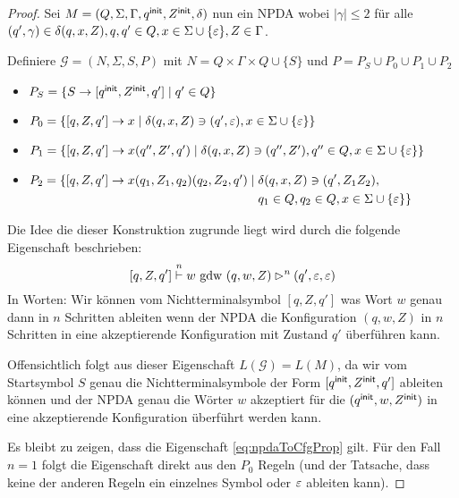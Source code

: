 \begin{proof}
 Sei $M = (Q, \Sigma, \Gamma, q^\mathsf{init}, Z^\mathsf{init}, \delta)$ nun ein NPDA wobei $|\gamma| \le 2$ für alle $(q', \gamma) \in \delta(q, x, Z), q, q' \in Q, x \in \Sigma \cup \{\varepsilon\}, Z \in \Gamma$.

    Definiere $\mathcal{G} = (N, \Sigma, S, P)$ mit $N = Q \times \Gamma \times Q \cup \{S\}$  und $P=P_S\cup P_0\cup P_1\cup P_2$
    \begin{itemize}
    \item $P_S = \{S \to [q^\mathsf{init}, Z^\mathsf{init}, q']\mid q'\in Q\}$
    \item $P_0 = \{ [q, Z, q'] \to x \mid \delta(q, x, Z) \ni (q', \varepsilon), x \in \Sigma \cup \{\varepsilon\} \}$
    \item $P_1 = \{[q, Z, q'] \to x(q'', Z', q') \mid \delta(q, x, Z) \ni (q'', Z'), q'' \in Q, x \in \Sigma \cup \{\varepsilon\}\}$
    \item $P_2 = \{[q, Z, q'] \to x(q_1,Z_1,q_2)(q_2, Z_2, q') \mid 
        \begin{aligned}[t]
          & \delta(q, x, Z) \ni (q', Z_1Z_2), \\
          & q_1 \in Q, q_2 \in Q, x \in \Sigma \cup \{\varepsilon\} \}
        \end{aligned}$
    \end{itemize}
    
    Die Idee die dieser Konstruktion zugrunde liegt wird durch die folgende Eigenschaft beschrieben:
      \begin{displaymath}\label{eq:npdaToCfgProp}
        [q,Z,q']\stackrel{n}{\vdash} w \text{ gdw } (q,w,Z) \rhd^n (q',\varepsilon,\varepsilon)
      \end{displaymath}
    In Worten: Wir können vom Nichtterminalsymbol $[q,Z,q']$ was Wort $w$ genau dann in $n$ Schritten ableiten
    wenn der \ac{NPDA} die Konfiguration $(q,w,Z)$ in $n$ Schritten in eine akzeptierende Konfiguration mit Zustand $q'$ überführen kann.
    
    Offensichtlich folgt aus dieser Eigenschaft $L(\mathcal{G}) = L(M)$, da wir vom Startsymbol $S$ genau die Nichtterminalsymbole der Form
    $[q^\mathsf{init}, Z^\mathsf{init}, q']$ ableiten können und der \ac{NPDA} genau die Wörter $w$ akzeptiert für die  $(q^\mathsf{init}, w, Z^\mathsf{init})$ in eine akzeptierende Konfiguration überführt werden kann.
    
    Es bleibt zu zeigen, dass die Eigenschaft \eqref{eq:npdaToCfgProp} gilt.
    Für den Fall $n=1$ folgt die Eigenschaft direkt aus den $P_0$ Regeln (und der Tatsache, dass keine der anderen Regeln ein einzelnes Symbol oder $\varepsilon$ ableiten kann).
    

\end{proof}
